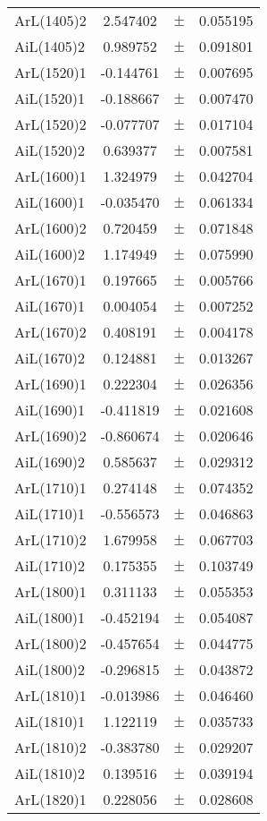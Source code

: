 \begin{table}
\begin{tiny}
\begin{tabular}{lccc}
ArL(1405)2 & 2.547402 & $\pm$ & 0.055195 \\
AiL(1405)2 & 0.989752 & $\pm$ & 0.091801 \\
ArL(1520)1 & -0.144761 & $\pm$ & 0.007695 \\
AiL(1520)1 & -0.188667 & $\pm$ & 0.007470 \\
ArL(1520)2 & -0.077707 & $\pm$ & 0.017104 \\
AiL(1520)2 & 0.639377 & $\pm$ & 0.007581 \\
ArL(1600)1 & 1.324979 & $\pm$ & 0.042704 \\
AiL(1600)1 & -0.035470 & $\pm$ & 0.061334 \\
ArL(1600)2 & 0.720459 & $\pm$ & 0.071848 \\
AiL(1600)2 & 1.174949 & $\pm$ & 0.075990 \\
ArL(1670)1 & 0.197665 & $\pm$ & 0.005766 \\
AiL(1670)1 & 0.004054 & $\pm$ & 0.007252 \\
ArL(1670)2 & 0.408191 & $\pm$ & 0.004178 \\
AiL(1670)2 & 0.124881 & $\pm$ & 0.013267 \\
ArL(1690)1 & 0.222304 & $\pm$ & 0.026356 \\
AiL(1690)1 & -0.411819 & $\pm$ & 0.021608 \\
ArL(1690)2 & -0.860674 & $\pm$ & 0.020646 \\
AiL(1690)2 & 0.585637 & $\pm$ & 0.029312 \\
ArL(1710)1 & 0.274148 & $\pm$ & 0.074352 \\
AiL(1710)1 & -0.556573 & $\pm$ & 0.046863 \\
ArL(1710)2 & 1.679958 & $\pm$ & 0.067703 \\
AiL(1710)2 & 0.175355 & $\pm$ & 0.103749 \\
ArL(1800)1 & 0.311133 & $\pm$ & 0.055353 \\
AiL(1800)1 & -0.452194 & $\pm$ & 0.054087 \\
ArL(1800)2 & -0.457654 & $\pm$ & 0.044775 \\
AiL(1800)2 & -0.296815 & $\pm$ & 0.043872 \\
ArL(1810)1 & -0.013986 & $\pm$ & 0.046460 \\
AiL(1810)1 & 1.122119 & $\pm$ & 0.035733 \\
ArL(1810)2 & -0.383780 & $\pm$ & 0.029207 \\
AiL(1810)2 & 0.139516 & $\pm$ & 0.039194 \\
ArL(1820)1 & 0.228056 & $\pm$ & 0.028608 \\

\end{tabular}
\end{tiny}
\end{table}
